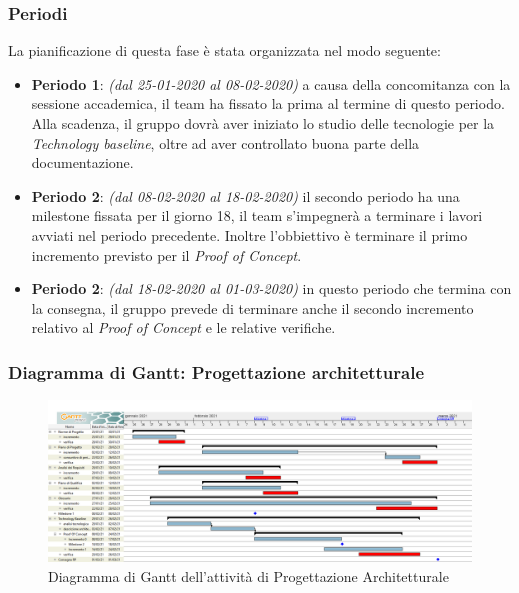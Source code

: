 \subsubsection{Periodi}
La pianificazione di questa fase è stata organizzata nel modo seguente:
\begin{itemize}
\item \textbf{Periodo 1}: \textit{(dal 25-01-2020 al 08-02-2020)} a causa della concomitanza con la sessione accademica, il team ha fissato la prima  al termine di questo periodo. Alla scadenza, il gruppo dovrà aver iniziato lo studio delle tecnologie per la \textit{Technology baseline}, oltre ad aver controllato buona parte della documentazione.

\item \textbf{Periodo 2}: \textit{(dal 08-02-2020 al 18-02-2020)} il secondo periodo ha una milestone fissata per il giorno 18, il team s'impegnerà a terminare i lavori avviati nel periodo precedente. Inoltre l'obbiettivo è terminare il primo incremento previsto per il \textit{Proof of Concept}.

\item \textbf{Periodo 2}: \textit{(dal 18-02-2020 al 01-03-2020)} in questo periodo che termina con la consegna, il gruppo prevede di terminare anche il secondo incremento relativo al \textit{Proof of Concept} e le relative verifiche.
\end{itemize}


\subsubsection{Diagramma di Gantt: Progettazione architetturale}
\begin{figure}[h]
	\centering	
	\includegraphics[scale=0.30]{Images/GanttPianificazioneProgettazioneArchitetturale.PNG}
	\caption{Diagramma di Gantt dell'attività di Progettazione Architetturale}
\end{figure}